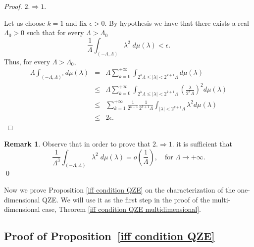 \documentclass[aip,jmp,12pt
]{revtex4}
\theoremstyle{definition}
\newtheorem{remark}{Remark}
\begin{document}
\begin{proof}
$2. \Rightarrow 1.$

Let us choose $k=1$ and fix $\epsilon >0$. By hypothesis we have that there exists a real $\Lambda_{0}>0$ such that for every $\Lambda>\Lambda_{0}$
$$
\frac{1}{\Lambda}\int_{(-\Lambda,\Lambda)} \lambda^2 \; d\mu(\lambda) <\epsilon.
$$
Thus, for every $\Lambda>\Lambda_{0}$,
\begin{eqnarray*}
\Lambda\int_{(-\Lambda,\Lambda)^c} d\mu(\lambda) & = & \Lambda \sum_{k=0}^{+\infty} \int_{2^{k}\Lambda \leq |\lambda| < 2^{k+1}\Lambda} d\mu(\lambda) \\
& \leq & \Lambda \sum_{k=0}^{+\infty}   \int_{2^{k}\Lambda \leq |\lambda| < 2^{k+1}\Lambda} \left(\frac{\lambda}{2^{k}\Lambda}\right)^2 d\mu(\lambda) \\
                                                    & \leq & \sum_{k=1}^{+\infty} \frac{1}{2^{k-1}} \frac{1}{2^{k+1}\Lambda} \int_{|\lambda| < 2^{k+1}\Lambda } \lambda^2 d\mu(\lambda) \\
                                               & \leq &  2\epsilon .
\end{eqnarray*}
\end{proof}

\begin{remark}
\label{only k}
Observe that in order to prove that $2. \Rightarrow 1.$ it is sufficient that
$$
\frac{1}{\Lambda^3}\int_{(-\Lambda,\Lambda)} \lambda^{2}\; d\mu(\lambda) = o\left( \frac{1}{\Lambda} \right), \quad \textrm{for $\Lambda \to + \infty$}.
$$
\qed
\end{remark}

Now we prove  Proposition \ref{iff condition QZE} on the characterization of the one-dimensional QZE. We will use it as the first step in the proof of the multi-dimensional case, Theorem \ref{iff condition QZE multidimensional}.




\subsection*{Proof of Proposition~\ref {iff condition QZE}}
\end{document}
